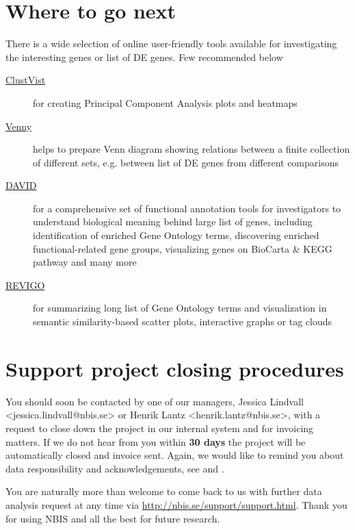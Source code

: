 \documentclass[12pt]{article}
\begin{document}
\section{Where to go next}
There is a wide selection of online user-friendly tools available for investigating the interesting genes or list of DE genes. Few recommended below 
\begin{description}
  \item[\href{hhttp://biit.cs.ut.ee/clustvis/}{ClustVist}] for creating Principal Component Analysis plots and heatmaps
  \item[\href{http://bioinfogp.cnb.csic.es/tools/venny/}{Venny}] helps to prepare Venn diagram showing relations between a finite collection of different sets, e.g. between list of DE genes from different comparisons
  \item[\href{https://david.ncifcrf.gov}{DAVID}] for a comprehensive set of functional annotation tools for investigators to understand biological meaning behind large list of genes, including identification of enriched Gene Ontology terms, discovering enriched functional-related gene groups, visualizing genes on BioCarta \& KEGG pathway and many more
  \item[\href{http://revigo.irb.hr}{REVIGO}] for summarizing long list of Gene Ontology terms and visualization in semantic similarity-based scatter plots, interactive graphs or tag clouds
\end{description}

\section{Support project closing procedures}
You should soon be contacted by one of our managers, Jessica Lindvall <jessica.lindvall@nbis.se> or Henrik Lantz <henrik.lantz@nbis.se>, with a request to close down the project in our internal system and for invoicing matters. If we do not hear from you within \textbf{30 days} the project will be automatically closed and invoice sent. Again, we would like to remind you about data responsibility and acknowledgements, see  and . 

You are naturally more than welcome to come back to us with further data analysis request at any time via \href{http://nbis.se/support/support.html}{http://nbis.se/support/support.html}. Thank you for using NBIS and all the best for future research. 


\newpage
\printbibliography
\end{document}
